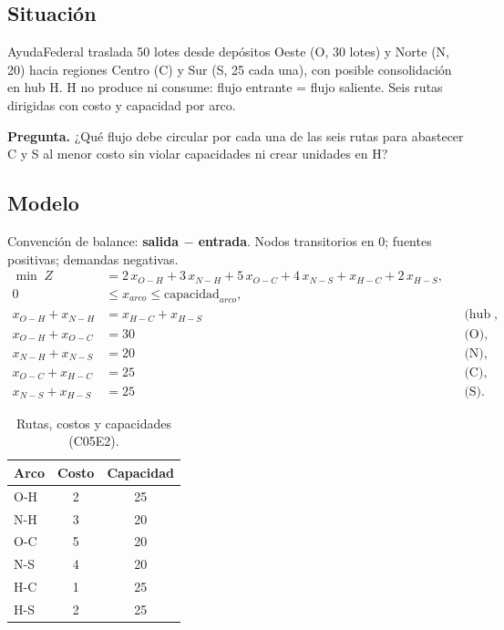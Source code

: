 \documentclass[11pt,a4paper]{article}
\newcommand{\pregunta}[1]{\noindent\textbf{Pregunta.} #1\par}
\begin{document}
\subsection*{Situación}
AyudaFederal traslada 50 lotes desde depósitos Oeste (O, 30 lotes) y Norte (N, 20) hacia regiones Centro (C) y Sur (S, 25 cada una), con posible consolidación en hub H. H no produce ni consume: flujo entrante = flujo saliente. Seis rutas dirigidas con costo y capacidad por arco.

\pregunta{¿Qué flujo debe circular por cada una de las seis rutas para abastecer C y S al menor costo sin violar capacidades ni crear unidades en H?}

\subsection*{Modelo}
Convención de balance: \textbf{salida $-$ entrada}. Nodos transitorios en 0; fuentes positivas; demandas negativas.
\begin{align}
\min \; Z &= 2\,x_{O\!-\!H} + 3\,x_{N\!-\!H} + 5\,x_{O\!-\!C} + 4\,x_{N\!-\!S} + x_{H\!-\!C} + 2\,x_{H\!-\!S},\\
0 &\le x_{arco} \le \text{capacidad}_{arco},\\
x_{O\!-\!H} + x_{N\!-\!H} &= x_{H\!-\!C} + x_{H\!-\!S} && \text{(hub H)},\\
x_{O\!-\!H} + x_{O\!-\!C} &= 30 && \text{(O)},\\
x_{N\!-\!H} + x_{N\!-\!S} &= 20 && \text{(N)},\\
x_{O\!-\!C} + x_{H\!-\!C} &= 25 && \text{(C)},\\
x_{N\!-\!S} + x_{H\!-\!S} &= 25 && \text{(S)}.
\end{align}

\begin{table}[H]
\centering
\small
\caption{Rutas, costos y capacidades (C05E2).}
\begin{tabular}{@{}lcc@{}}
\toprule
Arco & Costo & Capacidad \\
\midrule
O-H & 2 & 25 \\
N-H & 3 & 20 \\
O-C & 5 & 20 \\
N-S & 4 & 20 \\
H-C & 1 & 25 \\
H-S & 2 & 25 \\
\bottomrule
\end{tabular}
\end{table}
\end{document}

